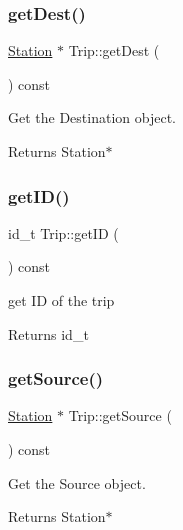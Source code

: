 \subsubsection{\texorpdfstring{get\+Dest()}{getDest()}}
{\footnotesize\ttfamily \mbox{\hyperlink{classStation}{Station}} $\ast$ Trip\+::get\+Dest (\begin{DoxyParamCaption}{ }\end{DoxyParamCaption}) const}



Get the Destination object. 

\begin{DoxyReturn}{Returns}
Station$\ast$ 
\end{DoxyReturn}
\mbox{\label{classTrip_a7770a61e1211789c80b003eeedcaa09c}} 
\subsubsection{\texorpdfstring{get\+I\+D()}{getID()}}
{\footnotesize\ttfamily id\+\_\+t Trip\+::get\+ID (\begin{DoxyParamCaption}{ }\end{DoxyParamCaption}) const}



get ID of the trip 

\begin{DoxyReturn}{Returns}
id\+\_\+t 
\end{DoxyReturn}
\mbox{\label{classTrip_a65b45d4816c85d47ef743e7c1cfe807f}} 
\subsubsection{\texorpdfstring{get\+Source()}{getSource()}}
{\footnotesize\ttfamily \mbox{\hyperlink{classStation}{Station}} $\ast$ Trip\+::get\+Source (\begin{DoxyParamCaption}{ }\end{DoxyParamCaption}) const}



Get the Source object. 

\begin{DoxyReturn}{Returns}
Station$\ast$ 
\end{DoxyReturn}
\mbox{\label{classTrip_a7595a39e9aa91e321d37b1696da50024}} 

